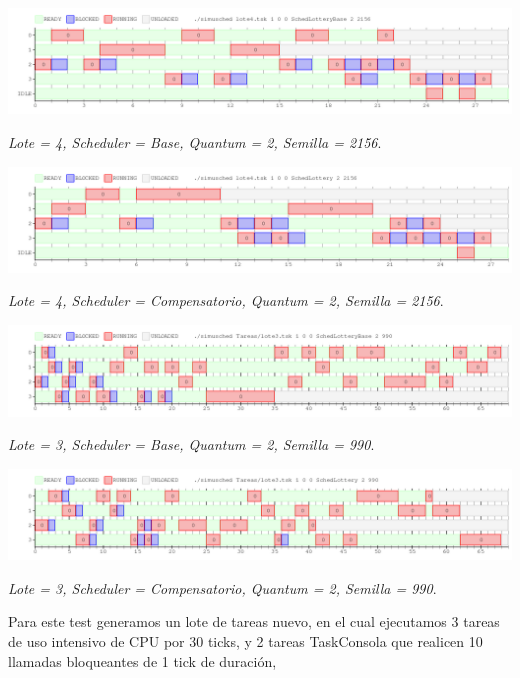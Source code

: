 \includegraphics[width=1\textwidth]{./Graficos/Ej10/testBase2.png}
\begin{center}
 \textit{Lote = 4, Scheduler = Base, Quantum = 2, Semilla = 2156}.
\end{center}


\includegraphics[width=1\textwidth]{./Graficos/Ej10/testComp2.png}
\begin{center}
 \textit{Lote = 4, Scheduler = Compensatorio, Quantum = 2, Semilla = 2156}.
\end{center}

	

\includegraphics[width=1\textwidth]{./Graficos/Ej10/testBase3.png}
\begin{center}
 \textit{Lote = 3, Scheduler = Base, Quantum = 2, Semilla = 990}.
\end{center}


\includegraphics[width=1\textwidth]{./Graficos/Ej10/testComp3.png}
\begin{center}
 \textit{Lote = 3, Scheduler = Compensatorio, Quantum = 2, Semilla = 990}.
\end{center}

\vspace{2mm}

Para este test generamos un lote de tareas nuevo, en el cual ejecutamos 3 tareas de uso intensivo de CPU por 30 ticks, y 2 tareas TaskConsola que realicen 10 llamadas bloqueantes de 1 tick de duraci\'on, 


